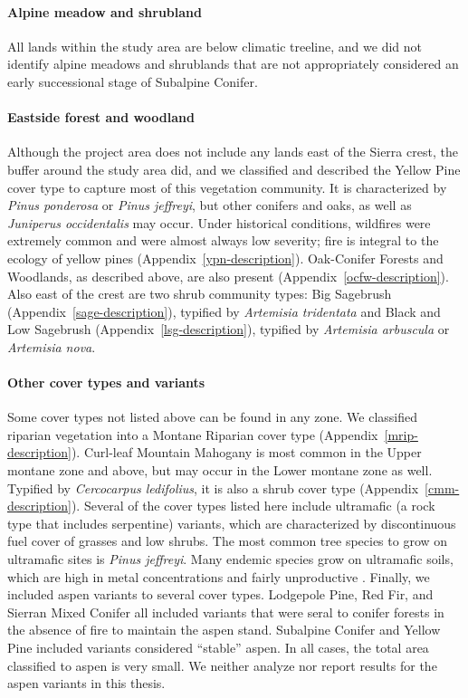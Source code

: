 \paragraph{Alpine meadow and shrubland} All lands within the study area are below climatic treeline, and we did not identify alpine meadows and shrublands that are not appropriately considered an early successional stage of Subalpine Conifer.


\paragraph{Eastside forest and woodland} Although the project area does not include any lands east of the Sierra crest, the buffer around the study area did, and we classified and described the Yellow Pine cover type to capture most of this vegetation community. It is characterized by \emph{Pinus ponderosa} or \emph{Pinus jeffreyi}, but other conifers and oaks, as well as \emph{Juniperus occidentalis} may occur. Under historical conditions, wildfires were extremely common and were almost always low severity; fire is integral to the ecology of yellow pines (Appendix~\ref{ypn-description}). 
%
Oak-Conifer Forests and Woodlands, as described above, are also present (Appendix~\ref{ocfw-description}). 
%
Also east of the crest are two shrub community types: Big Sagebrush (Appendix~\ref{sage-description}), typified by \emph{Artemisia tridentata} and Black and Low Sagebrush (Appendix~\ref{lsg-description}), typified by \emph{Artemisia arbuscula} or \emph{Artemisia nova}. 


\paragraph{Other cover types and variants} Some cover types not listed above can be found in any zone. We classified riparian vegetation into a Montane Riparian cover type (Appendix~\ref{mrip-description}). 
%
Curl-leaf Mountain Mahogany is most common in the Upper montane zone and above, but may occur in the Lower montane zone as well. Typified by \emph{Cercocarpus ledifolius}, it is also a shrub cover type (Appendix~\ref{cmm-description}). 
%
Several of the cover types listed here include ultramafic (a rock type that includes serpentine) variants, which are characterized by discontinuous fuel cover of grasses and low shrubs. The most common tree species to grow on ultramafic sites is \emph{Pinus jeffreyi}. Many endemic species grow on ultramafic soils, which are high in metal concentrations and fairly unproductive \citep{OGeen2007}.
%
Finally, we included aspen variants to several cover types. Lodgepole Pine, Red Fir, and Sierran Mixed Conifer all included variants that were seral to conifer forests in the absence of fire to maintain the aspen stand. Subalpine Conifer and Yellow Pine included variants considered ``stable'' aspen. In all cases, the total area classified to aspen is very small. We neither analyze nor report results for the aspen variants in this thesis.






